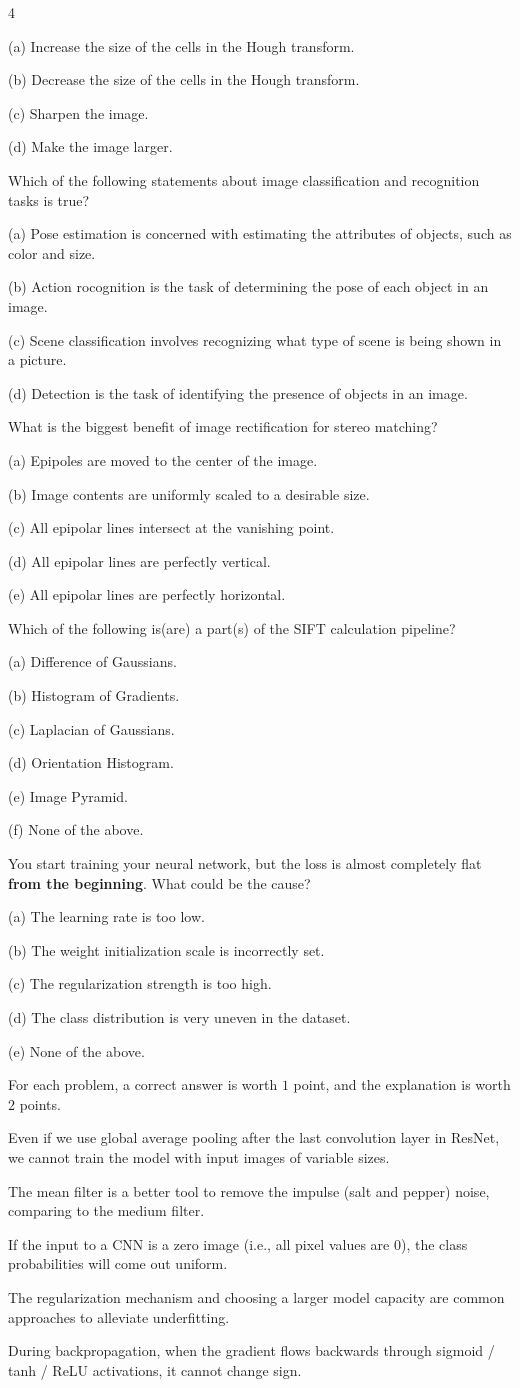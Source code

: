 \documentclass[8pt,a4paper,landscape]{extarticle}
\newcommand{\Htwo}[1]{\par\noindent{\tiny\bfseries\color{blue!45!black}#1}\par}
\newcommand{\Body}[1]{{\tiny #1\par}}
\begin{document}
\begin{multicols*}{4}
\Body{(a) Increase the size of the cells in the Hough transform.}
\Body{(b) Decrease the size of the cells in the Hough transform.}
\Body{(c) Sharpen the image.}
\Body{(d) Make the image larger.}
\Body{\textbullet{} Which of the following statements about image classification and recognition tasks is true?}
\Body{(a) Pose estimation is concerned with estimating the attributes of objects, such as color and size.}
\Body{(b) Action rocognition is the task of determining the pose of each object in an image.}
\Body{(c) Scene classification involves recognizing what type of scene is being shown in a picture.}
\Body{(d) Detection is the task of identifying the presence of objects in an image.}
\Body{\textbullet{} What is the biggest benefit of image rectification for stereo matching?}
\Body{(a) Epipoles are moved to the center of the image.}
\Body{(b) Image contents are uniformly scaled to a desirable size.}
\Body{(c) All epipolar lines intersect at the vanishing point.}
\Body{(d) All epipolar lines are perfectly vertical.}
\Body{(e) All epipolar lines are perfectly horizontal.}
\Body{\textbullet{} Which of the following is(are) a part(s) of the SIFT calculation pipeline?}
\Body{(a) Difference of Gaussians.}
\Body{(b) Histogram of Gradients.}
\Body{(c) Laplacian of Gaussians.}
\Body{(d) Orientation Histogram.}
\Body{(e) Image Pyramid.}
\Body{(f) None of the above.}
\Body{\textbullet{} You start training your neural network, but the loss is almost completely flat \textbf{from the beginning}. What could be the cause?}
\Body{(a) The learning rate is too low.}
\Body{(b) The weight initialization scale is incorrectly set.}
\Body{(c) The regularization strength is too high.}
\Body{(d) The class distribution is very uneven in the dataset.}
\Body{(e) None of the above.}
\Htwo{1.2 True or False ($21$ pts)}
\Body{For each problem, a correct answer is worth $1$ point, and the explanation is worth $2$ points.}
\Body{\textbullet{} Even if we use global average pooling after the last convolution layer in ResNet, we cannot train the model with input images of variable sizes.}
\Body{\textbullet{} The mean filter is a better tool to remove the impulse (salt and pepper) noise, comparing to the medium filter.}
\Body{\textbullet{} If the input to a CNN is a zero image (i.e., all pixel values are $0$), the class probabilities will come out uniform.}
\Body{\textbullet{} The regularization mechanism and choosing a larger model capacity are common approaches to alleviate underfitting.}
\Body{\textbullet{} During backpropagation, when the gradient flows backwards through sigmoid / tanh / ReLU activations, it cannot change sign.}

\end{multicols*}
\end{document}
